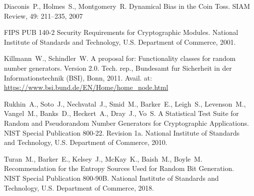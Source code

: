 \clearpage
\begin{thebibliography}{9}

Diaconis~P., Holmes~S., Montgomery~R. 
Dynamical Bias in the Coin Toss. 
SIAM Review, 49: 211--235, 2007

FIPS PUB 140-2 Security Requirements for Cryptographic Modules.
National Institute of Standards and Technology, U.S. Department of Commerce, 
2001.

Killmann~W., Schindler~W. 
A proposal for: Functionality classes for random number generators. Version 2.0. 
Tech. rep., Bundesamt fur Sicherheit in der Informationstechnik (BSI), Bonn, 2011.
Avail. at: \url{https://www.bsi.bund.de/EN/Home/home_node.html}

Rukhin~A., Soto~J., Nechvatal~J., Smid~M., Barker~E., Leigh~S., 
Levenson~M., Vangel~M., Banks~D., Heckert~A., Dray~J., Vo~S.
A Statistical Test Suite for Random and Pseudorandom Number Generators for
Cryptographic Applications. NIST Special Publication 800-22. Revision 1a.
National Institute of Standards and Technology, U.S. Department of Commerce, 
2010.

Turan~M., Barker~E., Kelsey~J., McKay~K., Baish~M., Boyle~M.
Recommendation for the Entropy Sources Used for Random Bit Generation.
NIST Special Publication 800-90B.
National Institute of Standards and Technology, U.S. Department of Commerce, 
2018.
\end{thebibliography}
